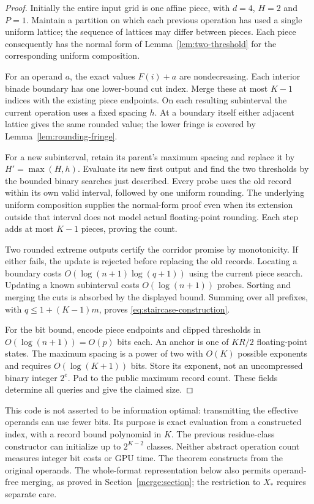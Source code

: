 \documentclass[11pt,reqno]{amsart}
\theoremstyle{definition}
\theoremstyle{remark}
\numberwithin{equation}{section}
\begin{document}
\begin{proof}
Initially the entire input grid is one affine piece, with $d=4$, $H=2$
and $P=1$. Maintain a partition on which each previous operation has
used a single uniform lattice; the sequence of lattices may differ
between pieces. Each piece consequently has the normal form of
Lemma~\ref{lem:two-threshold} for the corresponding uniform composition.

For an operand $a$, the exact values $F(i)+a$ are nondecreasing. Each
interior binade boundary has one lower-bound cut index. Merge these at
most $K-1$ indices with the existing piece endpoints. On each resulting
subinterval the current operation uses a fixed spacing $h$. At a
boundary itself either adjacent lattice gives the same rounded value;
the lower fringe is covered by Lemma~\ref{lem:rounding-fringe}.

For a new subinterval, retain its parent's maximum spacing and replace
it by $H'=\max(H,h)$. Evaluate its new first output and find the two
thresholds by the bounded binary searches just described. Every probe
uses the old record within its own valid interval, followed by one
uniform rounding. The underlying uniform composition supplies the
normal-form proof even when its extension outside that interval does
not model actual floating-point rounding. Each step adds at most $K-1$
pieces, proving the count.

Two rounded extreme outputs certify the corridor promise by monotonicity.
If either fails, the update is rejected before replacing the old records.
Locating a boundary costs $O(\log(n+1)\log(q+1))$ using the current
piece search. Updating a known subinterval costs $O(\log(n+1))$ probes.
Sorting and merging the cuts is absorbed by the displayed bound. Summing
over all prefixes, with $q\leq1+(K-1)m$, proves
\eqref{eq:staircase-construction}.

For the bit bound, encode piece endpoints and clipped thresholds in
$O(\log(n+1))=O(p)$ bits each. An anchor is one of $KR/2$ floating-point
states. The maximum spacing is a power of two with $O(K)$ possible
exponents and requires $O(\log(K+1))$ bits. Store its exponent, not an
uncompressed binary integer $2^e$. Pad to the public maximum record
count. These fields determine all queries and give the claimed size.
\end{proof}

This code is not asserted to be information optimal: transmitting the
effective operands can use fewer bits. Its purpose is exact evaluation
from a constructed index, with a record bound polynomial in $K$. The
previous residue-class constructor can initialize up to $2^{K-2}$ classes.
Neither abstract operation count measures integer bit costs or GPU time.
The theorem constructs from the original operands. The whole-format
representation below also permits operand-free merging, as proved in
Section~\ref{merge:section}; the restriction to $X_\ast$ requires separate care.
\end{document}
